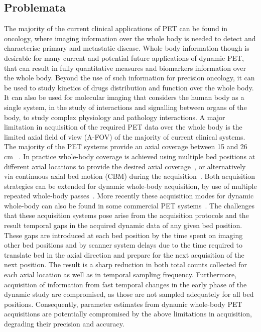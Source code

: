 \subsection*{Problemata}
The majority of the current clinical applications of PET can be found in oncology, where imaging information over the whole body is needed to detect and characterise primary and metastatic disease. 
Whole body information though is desirable for many current and potential future applications of dynamic PET, that can result in fully quantitative measures and biomarkers information over the whole body. Beyond the use of such information for precision oncology, it can be used to study kinetics of drugs distribution and function over the whole body. It can also be used for molecular imaging that considers the human body as a single system, in the study of interactions and signalling between organs of the body, to study complex physiology and pathology interactions.
A major limitation in acquisition of the required PET data over the whole body is the limited axial field of view (A-FOV) of the majority of current clinical systems. The majority of the PET systems provide an axial coverage between 15 and 26 cm ~\cite{Vandenberghe2020}. 
In practice whole-body coverage is achieved using multiple bed positions at different axial locations to provide the desired axial coverage~\cite{Schubert1996}, or alternatively via continuous axial bed motion (CBM) during the acquisition~\cite{Panin2014}. 
Both acquisition strategies can be extended for dynamic whole-body acquisition, by use of multiple repeated whole-body passes~\cite {Karakatsanis2011,Karakatsanis2013,Rahmim2019}. More recently these acquisition modes for dynamic whole-body can also be found in some commercial PET systems~\cite{Hu2020}. 
The challenges that these acquisition systems pose arise from the acquisition protocols and the result temporal gaps in the acquired dynamic data of any given bed position. These gaps are introduced at each bed position by the time spent on imaging other bed positions and by scanner system delays due to the time required to translate bed in the axial direction and prepare for the next acquisition of the next position. The result is a sharp reduction in both total counts collected for each axial location as well as in temporal sampling frequency. Furthermore, acquisition of information from fast temporal changes in the early phase of the dynamic study are compromised, as those are not sampled adequately for all bed positions. Consequently, parameter estimates from dynamic whole-body PET acquisitions are potentially compromised by the above limitations in acquisition, degrading their precision and accuracy.
